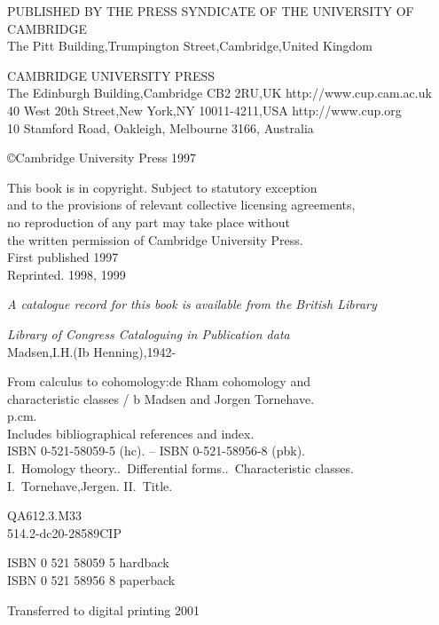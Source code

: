 \vspace*{\fill}
{\small\thispagestyle{empty}

PUBLISHED BY THE PRESS SYNDICATE OF THE UNIVERSITY OF CAMBRIDGE\\
The Pitt Building,Trumpington Street,Cambridge,United Kingdom

\vspace*{1em}
CAMBRIDGE UNIVERSITY PRESS\\
The Edinburgh Building,Cambridge CB2 2RU,UK http://www.cup.cam.ac.uk\\
40 West 20th Street,New York,NY 10011-4211,USA http://www.cup.org\\
10 Stamford Road, Oakleigh, Melbourne 3166, Australia

\vspace*{1em}
\copyright Cambridge University Press 1997

\vspace*{1em}
This book is in copyright. Subject to statutory exception\\
and to the provisions of relevant collective licensing agreements,\\
no reproduction of any part may take place without\\
the written permission of Cambridge University Press.\\

\vspace*{1em}
First published 1997\\
Reprinted. 1998, 1999

\vspace*{3em}
{\itshape A catalogue record for this book is available from the British Library}

\vspace*{1em}
{\itshape Library of Congress Cataloguing in Publication data}\\
Madsen,I.H.(Ib Henning),1942-

\qquad\parbox{.95\linewidth}{
  From calculus to cohomology:de Rham cohomology and\\
  characteristic classes / b Madsen and Jorgen Tornehave.\\
  p.\qquad cm.\\
  Includes bibliographical references and index.\\
  ISBN 0-521-58059-5 (hc). -- ISBN 0-521-58956-8 (pbk).\\
  I.\ Homology theory..\ Differential forms..\ Characteristic classes.\\
  I.\ Tornehave,Jergen. II.\ Title.
}

QA612.3.M33\\
514.2-dc20-28589\qquad CIP

\vspace*{2em}
ISBN 0 521 58059 5 hardback\\
ISBN 0 521 58956 8 paperback

\vspace*{2em}
Transferred to digital printing 2001
}
\vspace*{\fill}
\restoregeometry%